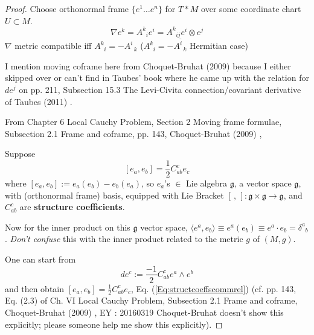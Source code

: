\documentclass[10pt, twoside]{amsart}
\begin{document}
\begin{multicols*}{2}
\begin{proof}
  Choose orthonormal frame $\lbrace e^1 \dots e^n \rbrace$ for $T*M$ over some coordinate chart $U\subset M$.  
\[
\nabla e^k = A^k_{ \; \; i} e^i = A^k_{ \; \; ij} e^i \otimes e^j
\]
$\nabla$ metric compatible iff $A^k_{ \; \; i} = - A^i_{ \; \; k}$ ($A^k_{ \; \; i} = -\overline{A^i_{ \; \; k}}$ Hermitian case)


I mention moving coframe here from Choquet-Bruhat (2009) \cite{YChoquet-Bruhat2009} because I either skipped over or can't find in Taubes' book where he came up with the relation for $de^j$ on pp. 211, Subsection 15.3 The Levi-Civita connection/covariant derivative of  Taubes (2011) \cite{CTaubes2011}.  





From Chapter 6 Local Cauchy Problem, Section 2 Moving frame formulae, Subsection 2.1 Frame and coframe, pp. 143, Choquet-Bruhat (2009) \cite{YChoquet-Bruhat2009},

Suppose 
\begin{equation}\label{Eq:structcoeffscommrel}
[e_a,e_b] = \frac{1}{2} C^c_{ab} e_c
\end{equation}
where $[e_a,e_b]:= e_a(e_b) - e_b(e_a)$, so $e_a$'s $\in $ Lie algebra $\mathfrak{g}$, a vector space $\mathfrak{g}$, with (orthonormal frame) basis, equipped with Lie Bracket $[ \, , \, ]:\mathfrak{g} \times \mathfrak{g} \to \mathfrak{g}$, and $C^c_{ab}$ are \textbf{structure coefficients}.    

Now for the inner product on this $\mathfrak{g}$ vector space, $\langle e^a, e_b \rangle \equiv e^a(e_b) \equiv e^a \cdot e_b =\delta^a_{ \; \; b }$.  \emph{Don't confuse} this with the inner product related to the metric $g$ of $(M,g)$.  

One can start from 
\[
de^c := \frac{-1}{2} C^c_{ab} e^a \wedge e^b
\]
and then obtain $[e_a,e_b] = \frac{1}{2} C^c_{ab} e_c$, Eq. (\ref{Eq:structcoeffscommrel}) (cf. pp. 143, Eq. (2.3) of Ch. VI Local Cauchy Problem, Subsection 2.1 Frame and coframe, Choquet-Bruhat (2009) \cite{YChoquet-Bruhat2009}, EY : 20160319 Choquet-Bruhat doesn't show this explicitly; please someone help me show this explicitly).  


\end{proof}
\end{multicols*}
\end{document}
